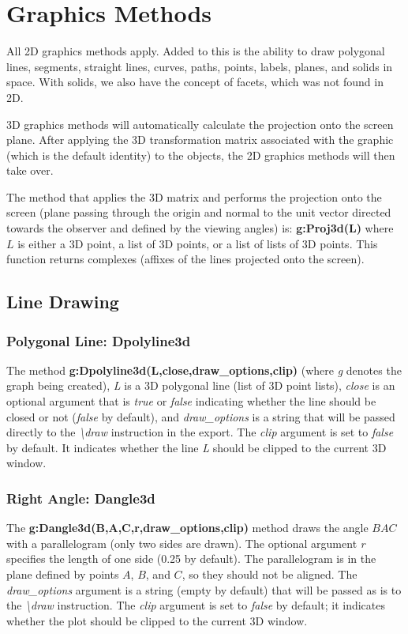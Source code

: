 \section{Graphics Methods}

All 2D graphics methods apply. Added to this is the ability to draw polygonal lines, segments, straight lines, curves, paths, points, labels, planes, and solids in space. With solids, we also have the concept of facets, which was not found in 2D.

3D graphics methods will automatically calculate the projection onto the screen plane. After applying the 3D transformation matrix associated with the graphic (which is the default identity) to the objects, the 2D graphics methods will then take over.

The method that applies the 3D matrix and performs the projection onto the screen (plane passing through the origin and normal to the unit vector directed towards the observer and defined by the viewing angles) is: \textbf{g:Proj3d(L)} where $L$ is either a 3D point, a list of 3D points, or a list of lists of 3D points. This function returns complexes (affixes of the lines projected onto the screen).

\subsection{Line Drawing}

\subsubsection{Polygonal Line: Dpolyline3d}

The method \textbf{g:Dpolyline3d(L,close,draw\_options,clip)} (where \emph{g} denotes the graph being created), \emph{L} is a 3D polygonal line (list of 3D point lists), \emph{close} is an optional argument that is \emph{true} or \emph{false} indicating whether the line should be closed or not (\emph{false} by default), and \emph{draw\_options} is a string that will be passed directly to the \emph{\textbackslash draw} instruction in the export. The \emph{clip} argument is set to \emph{false} by default. It indicates whether the line \emph{L} should be clipped to the current 3D window.

\subsubsection{Right Angle: Dangle3d}

The \textbf{g:Dangle3d(B,A,C,r,draw\_options,clip)} method draws the angle \(BAC\) with a parallelogram (only two sides are drawn). The optional argument \emph{r} specifies the length of one side (0.25 by default). The parallelogram is in the plane defined by points $A$, $B$, and $C$, so they should not be aligned. The \emph{draw\_options} argument is a string (empty by default) that will be passed as is to the \emph{\textbackslash draw} instruction. The \emph{clip} argument is set to \emph{false} by default; it indicates whether the plot should be clipped to the current 3D window.

